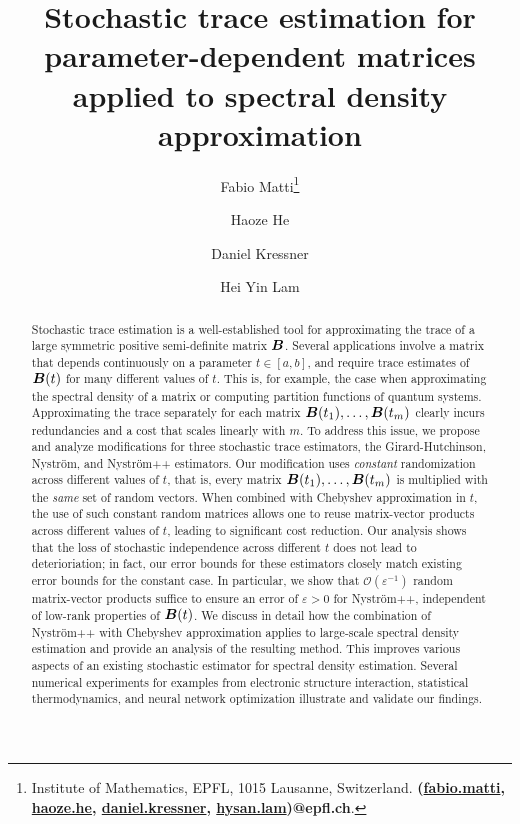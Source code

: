 \documentclass[11pt]{article}
\title{Stochastic trace estimation for parameter-dependent matrices applied to spectral density approximation}
\author{Fabio Matti\thanks{Institute of Mathematics, EPFL, 1015 Lausanne, Switzerland. {\textbf{(\href{mailto:fabio.matti@epfl.ch}{fabio.matti}, \href{mailto:haoze.he@epfl.ch}{haoze.he}, \href{mailto:daniel.kressner@epfl.ch}{daniel.kressner}, \href{mailto:hysan.lam@epfl.ch}{hysan.lam})@epfl.ch}}.}
\and Haoze He\footnotemark[1]
\and Daniel Kressner\footnotemark[1]
\and Hei Yin Lam\footnotemark[1]}
\begin{document}
\maketitle



\begin{abstract}
    Stochastic trace estimation is a well-established tool for approximating the trace of a large symmetric positive semi-definite matrix $\boldsymbol{B}$. Several applications involve a matrix that depends continuously on a parameter $t \in [a,b]$, and require trace estimates of $\boldsymbol{B}(t)$ for many different values of $t$. This is, for example, the case when approximating the spectral density of a matrix or computing partition functions of quantum systems. Approximating the trace separately for each matrix
    $\boldsymbol{B}(t_1), \dots, \boldsymbol{B}(t_m)$ clearly incurs redundancies and a cost that scales linearly with $m$. To address this issue, we propose and analyze modifications for three stochastic trace estimators, the Girard-Hutchinson, Nyström, and Nyström++ estimators. Our modification uses \emph{constant} randomization across different values of $t$, that is,
    every matrix $\boldsymbol{B}(t_1), \dots, \boldsymbol{B}(t_m)$ is multiplied with the \emph{same} set of random vectors.
    When combined with Chebyshev approximation in $t$, the use of such constant random matrices allows one to reuse matrix-vector products across different values of $t$, leading to significant cost reduction.
    Our analysis shows that the loss of stochastic independence across different $t$ does not lead to deterioriation; in fact, our error bounds for these estimators closely match existing error bounds for the constant case. In particular, we show that $\mathcal{O}(\varepsilon^{-1})$ random matrix-vector products suffice to ensure an error of $\varepsilon > 0$ for Nyström++, independent of low-rank properties of $\boldsymbol{B}(t)$. We discuss in detail how the combination of Nyström++ with 
    Chebyshev approximation applies to large-scale spectral density estimation and provide an analysis of the resulting method. This  improves various aspects of an existing stochastic estimator for spectral density estimation. Several numerical experiments for examples from electronic structure interaction, statistical thermodynamics, and neural network optimization illustrate and validate our findings.
\end{abstract}
\end{document}
